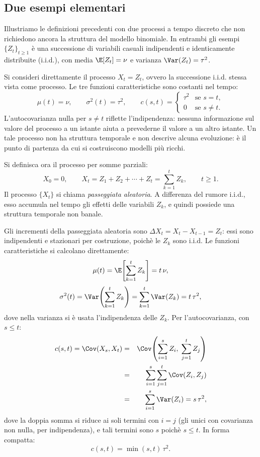 \subsection{Due esempi elementari}

\noindent
Illustriamo le definizioni precedenti con due processi a tempo
discreto che non richiedono ancora la struttura del modello binomiale.
In entrambi gli esempi $\{Z_t\}_{t\geq 1}$ \`{e} una successione di
variabili casuali indipendenti e identicamente distribuite (i.i.d.),
con media $\E[Z_t]=\nu$ e varianza $\Var(Z_t)=\tau^2$.

\begin{example}[Rumore i.i.d.]
\label{es:iid}
Si consideri direttamente il processo $X_t=Z_t$, ovvero la
successione i.i.d. stessa vista come processo. Le tre funzioni
caratteristiche sono costanti nel tempo:
\[
\mu(t)=\nu, \qquad \sigma^2(t)=\tau^2, \qquad
c(s,t)=\begin{cases}
\tau^2 & \text{se }s=t,\\
0 & \text{se }s\neq t.
\end{cases}
\]
L'autocovarianza nulla per $s\neq t$ riflette l'indipendenza: nessuna
informazione sul valore del processo a un istante aiuta a prevederne
il valore a un altro istante. Un tale processo non ha struttura
temporale e non descrive alcuna evoluzione: \`{e} il punto di partenza
da cui si costruiscono modelli pi\`{u} ricchi.
\end{example}

\begin{example}
\label{es:random-walk}
Si definisca ora il processo per somme parziali:
\[
X_0=0, \qquad X_t=Z_1+Z_2+\cdots+Z_t=\sum_{k=1}^{t}Z_k,
\qquad t\geq 1.
\]
Il processo $\{X_t\}$ si chiama \emph{passeggiata aleatoria}. A
differenza del rumore i.i.d., esso accumula nel tempo gli effetti
delle variabili $Z_k$, e quindi possiede una struttura temporale
non banale.

Gli incrementi della passeggiata aleatoria sono $\Delta X_t=X_t-
X_{t-1}=Z_t$: essi sono indipendenti e stazionari per costruzione,
poich\`{e} le $Z_k$ sono i.i.d. Le funzioni caratteristiche si
calcolano direttamente:
\[
\mu(t)=\E\!\left[\sum_{k=1}^{t}Z_k\right]=t\,\nu,
\]
\[
\sigma^2(t)=\Var\!\left(\sum_{k=1}^{t}Z_k\right)
=\sum_{k=1}^{t}\Var(Z_k)=t\,\tau^2,
\]
dove nella varianza si \`{e} usata l'indipendenza delle $Z_k$. Per
l'autocovarianza, con $s\leq t$:
\begin{eqnarray*}
c(s,t)=\Cov(X_s,X_t)
&=& \Cov\!\left(\sum_{i=1}^{s}Z_i,\;\sum_{j=1}^{t}Z_j\right)\\
&=& \sum_{i=1}^{s}\sum_{j=1}^{t}\Cov(Z_i,Z_j)\\
&=& \sum_{i=1}^{s}\Var(Z_i)
= s\,\tau^2,
\end{eqnarray*}
dove la doppia somma si riduce ai soli termini con $i=j$ (gli unici
con covarianza non nulla, per indipendenza), e tali termini sono
$s$ poich\`{e} $s\leq t$. In forma compatta:
\[
c(s,t)=\min(s,t)\,\tau^2.
\]
\end{example}

